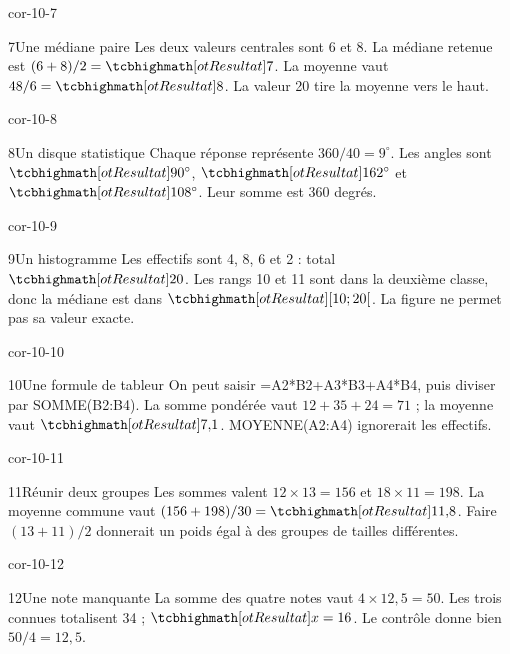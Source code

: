 \begin{blocLivre}{cor-10-7}\begin{corrige}{7}{Une médiane paire}
Les deux valeurs centrales sont 6 et 8. La médiane retenue est $(6+8)/2=\res7$. La moyenne vaut $48/6=\res8$. La valeur 20 tire la moyenne vers le haut.
\end{corrige}\end{blocLivre}
\begin{blocLivre}{cor-10-8}\begin{corrige}{8}{Un disque statistique}
Chaque réponse représente $360/40=9^\circ$. Les angles sont $\res{90^\circ}$, $\res{162^\circ}$ et $\res{108^\circ}$. Leur somme est 360 degrés.
\label{fig-cor-10-8}
\end{corrige}\end{blocLivre}
\begin{blocLivre}{cor-10-9}\begin{corrige}{9}{Un histogramme}
Les effectifs sont 4, 8, 6 et 2 : total $\res{20}$. Les rangs 10 et 11 sont dans la deuxième classe, donc la médiane est dans $\res{[10;20[}$. La figure ne permet pas sa valeur exacte.
\label{fig-cor-10-9}
\end{corrige}\end{blocLivre}
\begin{blocLivre}{cor-10-10}\begin{corrige}{10}{Une formule de tableur}
On peut saisir =A2*B2+A3*B3+A4*B4, puis diviser par SOMME(B2:B4). La somme pondérée vaut $12+35+24=71$ ; la moyenne vaut $\res{7{,}1}$. MOYENNE(A2:A4) ignorerait les effectifs.
\end{corrige}\end{blocLivre}
\begin{blocLivre}{cor-10-11}\begin{corrige}{11}{Réunir deux groupes}
Les sommes valent $12\times13=156$ et $18\times11=198$. La moyenne commune vaut $(156+198)/30=\res{11{,}8}$. Faire $(13+11)/2$ donnerait un poids égal à des groupes de tailles différentes.
\end{corrige}\end{blocLivre}
\begin{blocLivre}{cor-10-12}\begin{corrige}{12}{Une note manquante}
La somme des quatre notes vaut $4\times12{,}5=50$. Les trois connues totalisent 34 ; $\res{x=16}$. Le contrôle donne bien $50/4=12{,}5$.
\end{corrige}\end{blocLivre}
